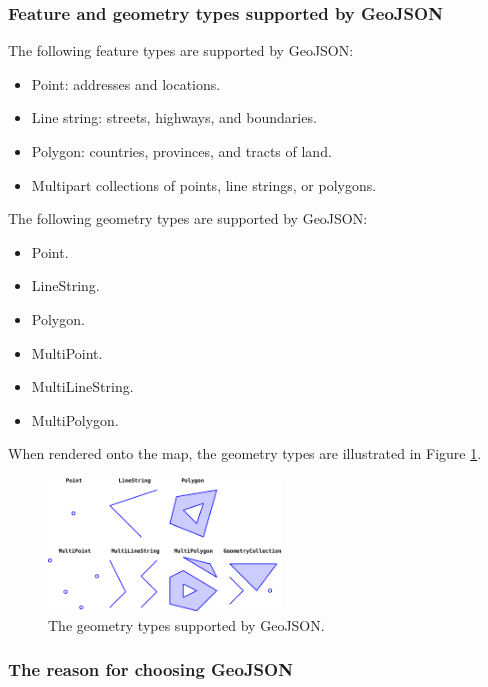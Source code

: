 \subsubsection{Feature and geometry types supported by GeoJSON}

The following feature types are supported by GeoJSON:

\begin{itemize}
    \item Point: addresses and locations.
    \item Line string: streets, highways, and boundaries.
    \item Polygon: countries, provinces, and tracts of land.
    \item Multipart collections of points, line strings, or polygons.
\end{itemize}

The following geometry types are supported by GeoJSON:

\begin{itemize}
    \item Point.
    \item LineString.
    \item Polygon.
    \item MultiPoint.
    \item MultiLineString.
    \item MultiPolygon.
\end{itemize}

When rendered onto the map, the geometry types are illustrated in Figure \ref{fig:geojson_geometry}.

\begin{figure}[H]
    \centering
    \includegraphics[width=0.55\textwidth]{assets/images/Research/geojson/geojson_features.png}
    \caption{The geometry types supported by GeoJSON.}
    \label{fig:geojson_geometry}
\end{figure}

\subsubsection{The reason for choosing GeoJSON}

